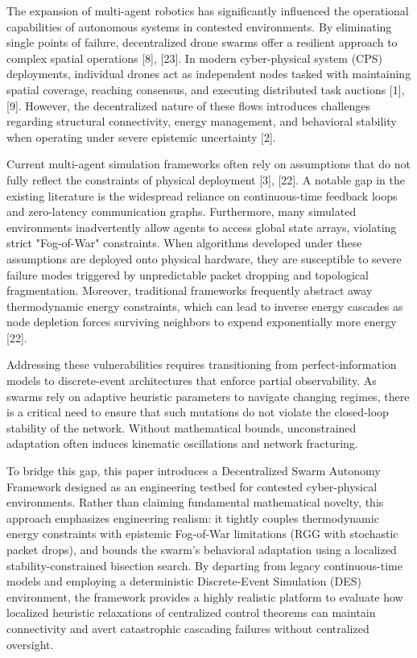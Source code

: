 \documentclass[conference]{IEEEtran}
\begin{document}
The expansion of multi-agent robotics has significantly influenced the operational capabilities of autonomous systems in contested environments. By eliminating single points of failure, decentralized drone swarms offer a resilient approach to complex spatial operations [8], [23]. In modern cyber-physical system (CPS) deployments, individual drones act as independent nodes tasked with maintaining spatial coverage, reaching consensus, and executing distributed task auctions [1], [9]. However, the decentralized nature of these flows introduces challenges regarding structural connectivity, energy management, and behavioral stability when operating under severe epistemic uncertainty [2].

Current multi-agent simulation frameworks often rely on assumptions that do not fully reflect the constraints of physical deployment [3], [22]. A notable gap in the existing literature is the widespread reliance on continuous-time feedback loops and zero-latency communication graphs. Furthermore, many simulated environments inadvertently allow agents to access global state arrays, violating strict "Fog-of-War" constraints. When algorithms developed under these assumptions are deployed onto physical hardware, they are susceptible to severe failure modes triggered by unpredictable packet dropping and topological fragmentation. Moreover, traditional frameworks frequently abstract away thermodynamic energy constraints, which can lead to inverse energy cascades as node depletion forces surviving neighbors to expend exponentially more energy [22].

Addressing these vulnerabilities requires transitioning from perfect-information models to discrete-event architectures that enforce partial observability. As swarms rely on adaptive heuristic parameters to navigate changing regimes, there is a critical need to ensure that such mutations do not violate the closed-loop stability of the network. Without mathematical bounds, unconstrained adaptation often induces kinematic oscillations and network fracturing.

To bridge this gap, this paper introduces a Decentralized Swarm Autonomy Framework designed as an engineering testbed for contested cyber-physical environments. Rather than claiming fundamental mathematical novelty, this approach emphasizes engineering realism: it tightly couples thermodynamic energy constraints with epistemic Fog-of-War limitations (RGG with stochastic packet drops), and bounds the swarm's behavioral adaptation using a localized stability-constrained bisection search. By departing from legacy continuous-time models and employing a deterministic Discrete-Event Simulation (DES) environment, the framework provides a highly realistic platform to evaluate how localized heuristic relaxations of centralized control theorems can maintain connectivity and avert catastrophic cascading failures without centralized oversight.
\end{document}
